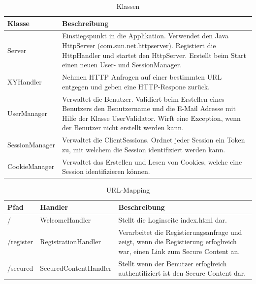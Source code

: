 \begin{table}[H]
\begin{center}
\begin{tabular}{l p{10.5cm} }
\hline
\textbf{Klasse} & \textbf{Beschreibung} \\ \hline \hline
Server      & Einstiegspunkt in die Applikation. Verwendet den Java HttpServer (com.sun.net.httpserver). Registiert die HttpHandler und startet den HttpServer. 
              Erstellt beim Start einen neuen User- und SessionManager. \\
XYHandler   & Nehmen HTTP Anfragen auf einer bestimmten URL entgegen und geben eine HTTP-Respone zurück. \\
UserManager & Verwaltet die Benutzer. Validiert beim Erstellen eines Benutzers den Benutzername und die E-Mail Adresse mit Hilfe der Klasse UserValidator.
              Wirft eine Exception, wenn der Benutzer nicht erstellt werden kann. \\
SessionManager & Verwaltet die ClientSessions. Ordnet jeder Session ein Token zu, mit welchem die Session identifiziert werden kann. \\
CookieManager & Verwaltet das Erstellen und Lesen von Cookies, welche eine Session identifizieren können. \\
\hline \hline
\end{tabular}
\caption{Klassen}
\label{tab:class}
\end{center}
\end{table}

\begin{table}[H]
\begin{center}
\begin{tabular}{l l p{7cm} }
\hline
\textbf{Pfad} & \textbf{Handler}    & \textbf{Beschreibung} \\ \hline \hline
/             & WelcomeHandler          & Stellt die Loginseite index.html dar.\\
/register     & RegistrationHandler     & Verarbeitet die Registierungsanfrage und zeigt, wenn die Registierung erfoglreich war, einen Link zum Secure Content an. \\
/secured      & SecuredContentHandler   & Stellt wenn der Benutzer erfoglreich authentifiziert ist den Secure Content dar.\\
\hline \hline
\end{tabular}
\caption{URL-Mapping}
\label{tab:url-mapping}
\end{center}
\end{table}

